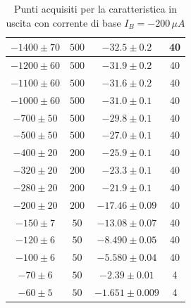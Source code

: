 \documentclass[]{article}
\begin{document}
\begin{table}[H]
\begin{tabular}{|c|c|c|c|}
		$ -1400\pm 70 $ &$ 500 $ & $ -32.5\pm 0.2 $ &40 \\
		\hline
		$ -1200\pm 60 $ &$ 500 $ & $ -31.9\pm 0.2 $ &40 \\
		\hline
		$ -1100\pm 60 $ &$ 500 $ & $ -31.6\pm 0.2 $ &40 \\
		\hline
		$ -1000\pm 60 $ &$ 500 $ & $ -31.0\pm 0.1 $ &40 \\
		\hline
		$ -700\pm 50 $ &$ 500 $ & $ -29.8\pm 0.1 $ &40 \\
		\hline
		$ -500\pm 50 $ &$ 500 $ & $ -27.0\pm 0.1 $ &40 \\
		\hline
		$ -400\pm 20 $ &$ 200 $ & $ -25.9\pm 0.1 $ &40 \\
		\hline
		$ -320\pm 20 $ &$ 200 $ & $-23.3\pm 0.1 $ &40 \\
		\hline
		$-280\pm 20 $ &$ 200 $ & $ -21.9\pm 0.1 $ &40 \\
		\hline
		$ -200\pm 20 $ &$ 200 $ & $ -17.46\pm 0.09 $ &40 \\
		\hline
		$ -150\pm 7 $ &$ 50 $ & $ -13.08\pm 0.07 $ &40 \\
		\hline
		$ -120\pm 6 $ &$ 50 $ & $ -8.490\pm 0.05 $ &40 \\
		\hline
		$ -100\pm 6 $ &$ 50 $ & $ -5.580\pm 0.04 $ &40 \\
		\hline
		$ -70\pm 6 $ &$ 50 $ & $ -2.39\pm 0.01 $ &4 \\
		\hline
		$ -60\pm 5 $ &$ 50 $ & $ -1.651\pm 0.009 $ &4 \\
		\hline
	\end{tabular}
		\caption{Punti acquisiti per la caratteristica in uscita con corrente di base $ I_{B}= -200\, \mu A $}
		\label{tab:200muA}
	\end{table}
\end{document}
